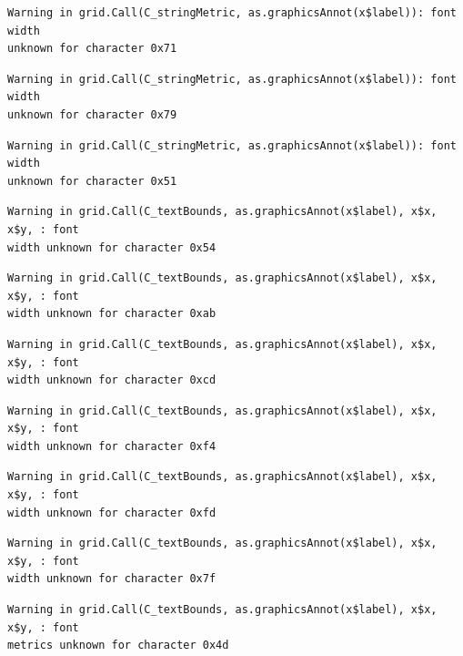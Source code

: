 \documentclass[
  letterpaper,
  DIV=11,
  numbers=noendperiod]{scrreprt}
\begin{document}
\begin{verbatim}
Warning in grid.Call(C_stringMetric, as.graphicsAnnot(x$label)): font width
unknown for character 0x71
\end{verbatim}

\begin{verbatim}
Warning in grid.Call(C_stringMetric, as.graphicsAnnot(x$label)): font width
unknown for character 0x79
\end{verbatim}

\begin{verbatim}
Warning in grid.Call(C_stringMetric, as.graphicsAnnot(x$label)): font width
unknown for character 0x51
\end{verbatim}

\begin{verbatim}
Warning in grid.Call(C_textBounds, as.graphicsAnnot(x$label), x$x, x$y, : font
width unknown for character 0x54
\end{verbatim}

\begin{verbatim}
Warning in grid.Call(C_textBounds, as.graphicsAnnot(x$label), x$x, x$y, : font
width unknown for character 0xab
\end{verbatim}

\begin{verbatim}
Warning in grid.Call(C_textBounds, as.graphicsAnnot(x$label), x$x, x$y, : font
width unknown for character 0xcd
\end{verbatim}

\begin{verbatim}
Warning in grid.Call(C_textBounds, as.graphicsAnnot(x$label), x$x, x$y, : font
width unknown for character 0xf4
\end{verbatim}

\begin{verbatim}
Warning in grid.Call(C_textBounds, as.graphicsAnnot(x$label), x$x, x$y, : font
width unknown for character 0xfd
\end{verbatim}

\begin{verbatim}
Warning in grid.Call(C_textBounds, as.graphicsAnnot(x$label), x$x, x$y, : font
width unknown for character 0x7f
\end{verbatim}

\begin{verbatim}
Warning in grid.Call(C_textBounds, as.graphicsAnnot(x$label), x$x, x$y, : font
metrics unknown for character 0x4d
\end{verbatim}
\end{document}
